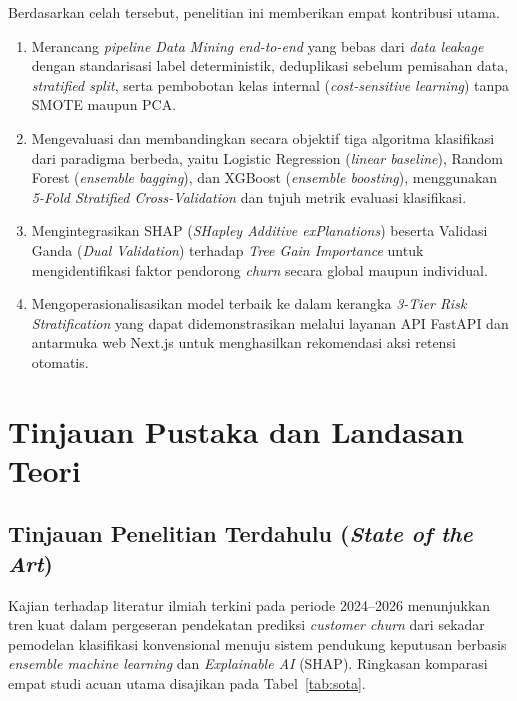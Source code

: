 \documentclass[11pt,a4paper]{article}
\begin{document}
Berdasarkan celah tersebut, penelitian ini memberikan empat kontribusi utama.
\begin{enumerate}[leftmargin=0.7cm, itemsep=2pt]
  \item Merancang \textit{pipeline Data Mining end-to-end} yang bebas dari \textit{data leakage} dengan standarisasi label deterministik, deduplikasi sebelum pemisahan data, \textit{stratified split}, serta pembobotan kelas internal (\textit{cost-sensitive learning}) tanpa SMOTE maupun PCA.
  \item Mengevaluasi dan membandingkan secara objektif tiga algoritma klasifikasi dari paradigma berbeda, yaitu Logistic Regression (\textit{linear baseline}), Random Forest (\textit{ensemble bagging}), dan XGBoost (\textit{ensemble boosting}), menggunakan \textit{5-Fold Stratified Cross-Validation} dan tujuh metrik evaluasi klasifikasi.
  \item Mengintegrasikan SHAP (\textit{SHapley Additive exPlanations}) beserta Validasi Ganda (\textit{Dual Validation}) terhadap \textit{Tree Gain Importance} untuk mengidentifikasi faktor pendorong \textit{churn} secara global maupun individual.
  \item Mengoperasionalisasikan model terbaik ke dalam kerangka \textit{3-Tier Risk Stratification} yang dapat didemonstrasikan melalui layanan API FastAPI dan antarmuka web Next.js untuk menghasilkan rekomendasi aksi retensi otomatis.
\end{enumerate}

\section{Tinjauan Pustaka dan Landasan Teori}

\subsection{Tinjauan Penelitian Terdahulu (\textit{State of the Art})}

Kajian terhadap literatur ilmiah terkini pada periode 2024--2026 menunjukkan tren kuat dalam pergeseran pendekatan prediksi \textit{customer churn} dari sekadar pemodelan klasifikasi konvensional menuju sistem pendukung keputusan berbasis \textit{ensemble machine learning} dan \textit{Explainable AI} (SHAP). Ringkasan komparasi empat studi acuan utama disajikan pada Tabel~\ref{tab:sota}.
\end{document}
